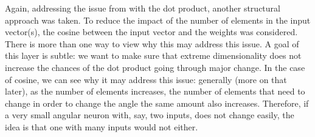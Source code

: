 Again, addressing the issue from \cite{goodfellow2015explaining} with the dot product, another
structural approach was taken. To reduce the impact of the number of elements in the input vector(s),
the cosine between the input vector and the weights was considered. There is more than one way to
view why this may address this issue. A goal of this layer is subtle: we want to make sure that
extreme dimensionality does not increase the chances of the dot product going through major change.
In the case of cosine, we can see why it may address this issue: generally (more on that later), as
the number of elements increases, the number of elements that need to change in order to change the
angle the same amount also increases. Therefore, if a very small angular neuron with, say, two
inputs, does not change easily, the idea is that one with many inputs would not either.


